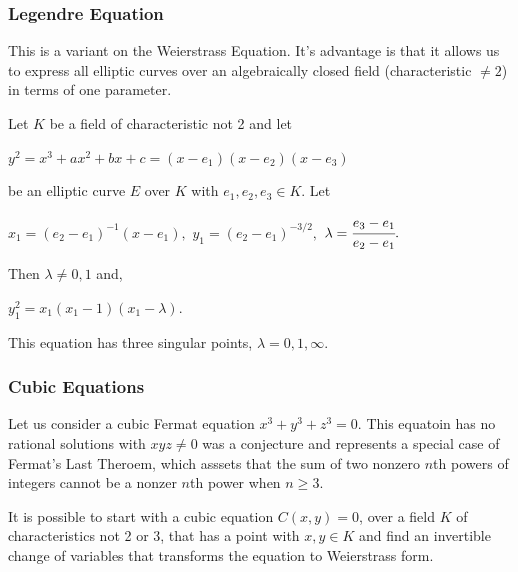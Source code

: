 \documentclass[a4paper, 12pt]{article}
\begin{document}
\subsubsection{Legendre Equation}
This is a variant on the Weierstrass Equation. It's advantage is that it allows us to express all elliptic curves over an algebraically closed field (characteristic $\neq 2$) in terms of one parameter.\par
Let $K$ be a field of characteristic not 2 and let
\begin{center} $y^2 = x^3 + ax^2 + bx + c = (x - e_1)(x - e_2)(x - e_3)$ \end{center}
be an elliptic curve $E$ over $K$ with $e_1,e_2,e_3 \in K$. Let
\begin{center}
$x_1 = (e_2 - e_1)^{-1}(x - e_1),$  \:\: $y_1=(e_2-e_1)^{-3/2},$  \:\: $\lambda = \cfrac{e_3-e_1}{e_2 -e_1}.$
\end{center}
Then $\lambda \neq 0,1$ and,
\begin{center} $y_1^2 = x_1(x_1-1)(x_1-\lambda)$. \end{center}
This equation has three singular points, $\lambda = 0,1,\infty$.
\subsubsection{Cubic Equations}
Let us consider a cubic Fermat equation $x^3+y^3+z^3=0.$\newline
This equatoin has no rational solutions with $xyz \neq 0$ was a conjecture and represents a special case of Fermat's Last Theroem, which asssets that the sum of two nonzero $n$th powers of integers cannot be a nonzer $n$th power when $n\geq 3$. \par
It is possible to start with a cubic equation $C(x,y)=0$, over a field $K$ of characteristics not 2 or 3, that has a point with $x,y\in K$ and find an invertible change of variables that transforms the equation to Weierstrass form.
\end{document}
